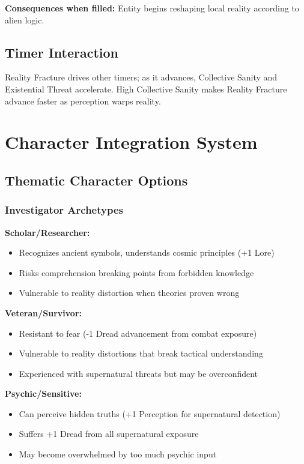 \documentclass[11pt]{article}
\begin{document}
\textbf{Consequences when filled:} Entity begins reshaping local reality according to alien logic.

\subsection{Timer Interaction}

Reality Fracture drives other timers; as it advances, Collective Sanity and Existential Threat accelerate. High Collective Sanity makes Reality Fracture advance faster as perception warps reality.

\section{Character Integration System}

\subsection{Thematic Character Options}

\subsubsection{Investigator Archetypes}

\textbf{Scholar/Researcher:}
\begin{itemize}
\item Recognizes ancient symbols, understands cosmic principles (+1 Lore)
\item Risks comprehension breaking points from forbidden knowledge
\item Vulnerable to reality distortion when theories proven wrong
\end{itemize}

\textbf{Veteran/Survivor:}
\begin{itemize}
\item Resistant to fear (-1 Dread advancement from combat exposure)
\item Vulnerable to reality distortions that break tactical understanding
\item Experienced with supernatural threats but may be overconfident
\end{itemize}

\textbf{Psychic/Sensitive:}
\begin{itemize}
\item Can perceive hidden truths (+1 Perception for supernatural detection)
\item Suffers +1 Dread from all supernatural exposure
\item May become overwhelmed by too much psychic input
\end{itemize}
\end{document}
